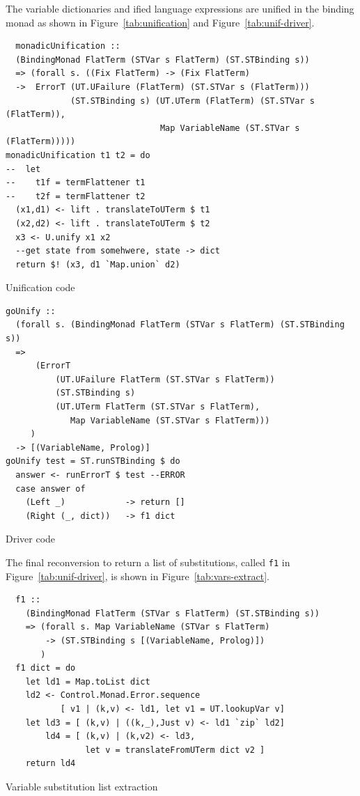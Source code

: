 \documentclass[thesis-solanki.tex]{subfiles}
\begin{document}
The variable dictionaries and ified language expressions are unified in the binding monad as shown
in Figure~\ref{tab:unification} and Figure~\ref{tab:unif-driver}.

%
\begin{code-list}
\begin{verbatim}
  monadicUnification ::
  (BindingMonad FlatTerm (STVar s FlatTerm) (ST.STBinding s))
  => (forall s. ((Fix FlatTerm) -> (Fix FlatTerm)
  ->  ErrorT (UT.UFailure (FlatTerm) (ST.STVar s (FlatTerm)))
             (ST.STBinding s) (UT.UTerm (FlatTerm) (ST.STVar s (FlatTerm)),
                               Map VariableName (ST.STVar s (FlatTerm)))))
monadicUnification t1 t2 = do
--  let
--    t1f = termFlattener t1
--    t2f = termFlattener t2
  (x1,d1) <- lift . translateToUTerm $ t1
  (x2,d2) <- lift . translateToUTerm $ t2
  x3 <- U.unify x1 x2
  --get state from somehwere, state -> dict
  return $! (x3, d1 `Map.union` d2)
\end{verbatim}
  \vspace*{-1.0\baselineskip}
  \caption{Unification code}
  \label{tab:unification}
\end{code-list}

\begin{code-list}[H]
\begin{verbatim}
goUnify ::
  (forall s. (BindingMonad FlatTerm (STVar s FlatTerm) (ST.STBinding s))
  =>
      (ErrorT
          (UT.UFailure FlatTerm (ST.STVar s FlatTerm))
          (ST.STBinding s)
          (UT.UTerm FlatTerm (ST.STVar s FlatTerm),
             Map VariableName (ST.STVar s FlatTerm)))
     )
  -> [(VariableName, Prolog)]
goUnify test = ST.runSTBinding $ do
  answer <- runErrorT $ test --ERROR
  case answer of
    (Left _)            -> return []
    (Right (_, dict))   -> f1 dict
\end{verbatim}
  \caption{Driver code}
  \label{tab:unif-driver}
\end{code-list}


The final reconversion to return a list of substitutions,
  called \texttt{f1} in Figure~\ref{tab:unif-driver}, is shown in
  Figure~\ref{tab:vars-extract}.
\begin{code-list}[H]
  \begin{verbatim}
  f1 ::
    (BindingMonad FlatTerm (STVar s FlatTerm) (ST.STBinding s))
    => (forall s. Map VariableName (STVar s FlatTerm)
        -> (ST.STBinding s [(VariableName, Prolog)])
       )
  f1 dict = do
    let ld1 = Map.toList dict
    ld2 <- Control.Monad.Error.sequence
           [ v1 | (k,v) <- ld1, let v1 = UT.lookupVar v]
    let ld3 = [ (k,v) | ((k,_),Just v) <- ld1 `zip` ld2]
        ld4 = [ (k,v) | (k,v2) <- ld3,
                let v = translateFromUTerm dict v2 ]
    return ld4
  \end{verbatim}
  \caption{Variable substitution list extraction}
  \label{tab:vars-extract}
\end{code-list}
\end{document}

